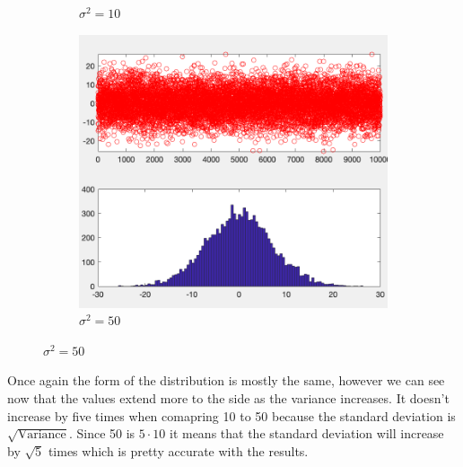 \documentclass{article}
\begin{document}
\begin{figure}[H]
\begin{subfigure}[h]{0.33\linewidth}
        \caption{\( \sigma^2 = 10\)}
    \end{subfigure}
    \begin{subfigure}[h]{0.33\linewidth}
        \includegraphics[width=\linewidth]{imgs/q1c_50.png}
        \caption{\( \sigma^2 = 50\)}
    \end{subfigure}
\end{figure}
Once again the form of the distribution is mostly the same, however we can see now that the values
extend more to the side as the variance increases. It doesn't increase by five times when comapring 10 to 50 because
the standard deviation is \( \sqrt{\mathrm{Variance}} \). Since 50 is \( 5\cdot10 \) it means that the standard 
deviation will increase by \(\sqrt{5} \) times which is pretty accurate with the results.   
\end{document}
